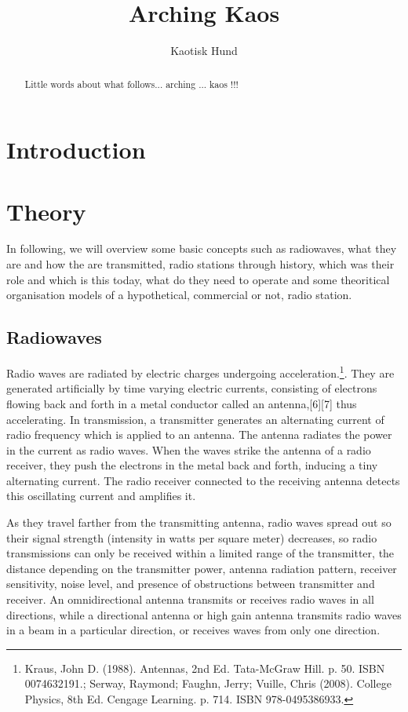 \documentclass[12pt]{report}
\title{Arching Kaos}
\author{Kaotisk Hund}
\begin{document}
\maketitle
\begin{abstract}
Little words about what follows... arching ... kaos !!!
\end{abstract}
\tableofcontents
{}
\chapter{Introduction}
\chapter{Theory}
In following, we will overview some basic concepts such as radiowaves, what they are and how the are transmitted, radio stations through history, which was their role and which is this today, what do they need to operate and some theoritical organisation models of a hypothetical, commercial or not, radio station.

\section{Radiowaves}
Radio waves are radiated by electric charges undergoing acceleration\cite{first}.\footnote{Kraus, John D. (1988). Antennas, 2nd Ed. Tata-McGraw Hill. p. 50. ISBN 0074632191.; Serway, Raymond; Faughn, Jerry; Vuille, Chris (2008). College Physics, 8th Ed. Cengage Learning. p. 714. ISBN 978-0495386933.}. They are generated artificially by time varying electric currents, consisting of electrons flowing back and forth in a metal conductor called an antenna,[6][7] thus accelerating. In transmission, a transmitter generates an alternating current of radio frequency which is applied to an antenna. The antenna radiates the power in the current as radio waves. When the waves strike the antenna of a radio receiver, they push the electrons in the metal back and forth, inducing a tiny alternating current. The radio receiver connected to the receiving antenna detects this oscillating current and amplifies it.

As they travel farther from the transmitting antenna, radio waves spread out so their signal strength (intensity in watts per square meter) decreases, so radio transmissions can only be received within a limited range of the transmitter, the distance depending on the transmitter power, antenna radiation pattern, receiver sensitivity, noise level, and presence of obstructions between transmitter and receiver. An omnidirectional antenna transmits or receives radio waves in all directions, while a directional antenna or high gain antenna transmits radio waves in a beam in a particular direction, or receives waves from only one direction.
\end{document}

